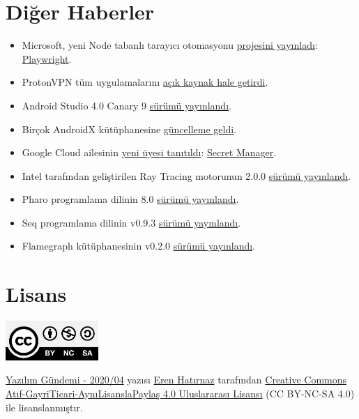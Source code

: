 \documentclass[11pt]{article}
\begin{document}
\section{Diğer Haberler}
\label{sec:org5bc14ce}
\begin{itemize}
\item Microsoft, yeni Node tabanlı tarayıcı otomasyonu \href{https://css-tricks.com/playwright/}{projesini yayınladı}:
\href{https://github.com/microsoft/playwright}{Playwright}.
\item ProtonVPN tüm uygulamalarını \href{https://protonvpn.com/blog/open-source/}{açık kaynak hale getirdi}.
\item Android Studio 4.0 Canary 9 \href{https://androidstudio.googleblog.com/2020/01/android-studio-40-canary-9-available.html}{sürümü yayınlandı}.
\item Birçok AndroidX kütüphanesine \href{https://developer.android.com/jetpack/androidx/versions/all-channel\#january\_22\_2020}{güncelleme geldi}.
\item Google Cloud ailesinin \href{https://cloud.google.com/blog/products/identity-security/introducing-google-clouds-secret-manager}{yeni üyesi tanıtıldı}: \href{https://cloud.google.com/secret-manager/docs}{Secret Manager}.
\item Intel tarafından geliştirilen Ray Tracing motorunun 2.0.0 \href{https://github.com/ospray/ospray/releases/tag/v2.0.0}{sürümü yayınlandı}.
\item Pharo programlama dilinin 8.0 \href{http://pharo.org/news/pharo8.0-released}{sürümü yayınlandı}.
\item Seq programlama dilinin v0.9.3 \href{https://github.com/seq-lang/seq/releases/tag/v0.9.3}{sürümü yayınlandı}.
\item Flamegraph kütüphanesinin v0.2.0 \href{https://github.com/flamegraph-rs/flamegraph/releases/tag/v0.2.0}{sürümü yayınlandı}.
\end{itemize}
\section{Lisans}
\label{sec:orge994b68}
\begin{center}
\begin{center}
\includegraphics[height=1.5cm]{../../../img/CC_BY-NC-SA_4.0.png}
\end{center}

\href{yazilim-gundemi-2020-04.pdf}{Yazılım Gündemi - 2020/04} yazısı \href{https://erenhatirnaz.github.io}{Eren Hatırnaz} tarafından \href{http://creativecommons.org/licenses/by-nc-sa/4.0/}{Creative Commons
Atıf-GayriTicari-AynıLisanslaPaylaş 4.0 Uluslararası Lisansı} (CC BY-NC-SA 4.0)
ile lisanslanmıştır.
\end{center}
\end{document}
